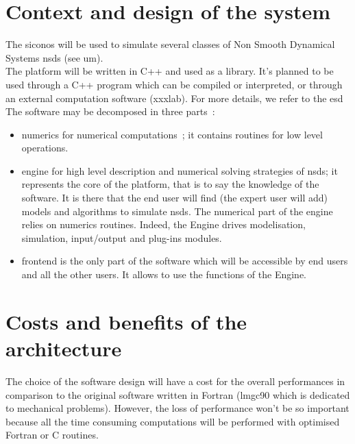 

\section{Context and design of the system}

The \ac{siconos} will be used to simulate several classes of Non Smooth Dynamical Systems
\acs{nsds} (see \ac{um}).\\

The platform will be written in C++ and used as a library. It's planned to be used through a
C++ program which can be compiled or interpreted, or through an external computation software (\ac{xxxlab}). For more details, we refer to the \ac{esd}\\

The software may be decomposed in three parts~:
  \begin{itemize}
        \item \acs{numerics} for numerical computations~;
        it contains routines for low level operations. 
        \item \acs{engine} for high level description and numerical solving strategies of \ac{nsds};
        it represents the core of the platform, that is to say the knowledge of the software. It is there that the end user will find (the expert user will add) models and algorithms to simulate \ac{nsds}. The  numerical part of the  \acs{engine} relies on \acs{numerics} routines. Indeed, the Engine  drives modelisation, simulation, input/output and plug-ins modules.
        \item \acs{frontend} is the only part of the software which will be accessible by end
	users and all the other users. It allows to use the functions of the Engine.
  \end{itemize}
  
  
\section{Costs and benefits of the architecture}
The choice of the software design will have a cost for the overall performances in comparison to the original software written in Fortran
(\ac{lmgc90} which is dedicated to mechanical problems). However, the loss of performance won't be so important because all the time consuming computations will be performed with optimised Fortran or C routines.
  
